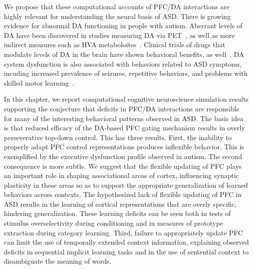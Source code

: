 We propose that these computational accounts of PFC/DA interactions are highly relevant for understanding the neural basis of ASD. There is growing evidence for abnormal DA functioning in people with autism. Aberrant levels of DA have been discovered in studies measuring DA via PET~\cite{FernellE:1997:AutismPET}, as well as more indirect measures such as HVA metaboloites~\cite{MartineauJ:1992:AutismDopamine}. Clinical trials of drugs that modulate levels of DA in the brain have shown behavioral benefits, as well~\cite{PoseyDJ:2000:AutismDopamine,TsaiLY:1999:AutismDopamine}. DA system dysfunction is also associated with behaviors related to ASD symptoms, incuding increased prevalence of seizures, repetitive behaviors, and problems with skilled motor learning~\cite{RefWorks:1,RefWorks:3,RefWorks:5,RefWorks:2,RefWorks:109}.

In this chapter, we report computational cognitive neuroscience simulation results supporting the conjecture that deficits in PFC/DA interactions are responsible for many of the interesting behavioral patterns observed in ASD. The basic idea is that reduced efficacy of the DA-based PFC gating mechanism results in overly perseverative top-down control. This has three results. First, the inability to properly adapt PFC control representations produces inflexible behavior. This is exemplified by the executive dysfunction profile observed in autism. The second consequence is more subtle. We suggest that the flexible updating of PFC plays an important role in shaping associational areas of cortex, influencing synaptic plasticity in these areas so as to support the appropriate generalization of learned behaviors across contexts. The hypothesized lack of flexible updating of PFC in ASD results in the learning of cortical representations that are overly specific, hindering generalization. These learning deficits can be seen both in tests of stimulus overselectivity during conditioning and in measures of prototype extraction during category learning. Third, failure to appropriately update PFC can limit the use of temporally extended context information, explaining observed deficits in sequential implicit learning tasks and in the use of sentential context to disambiguate the meaning of words.


